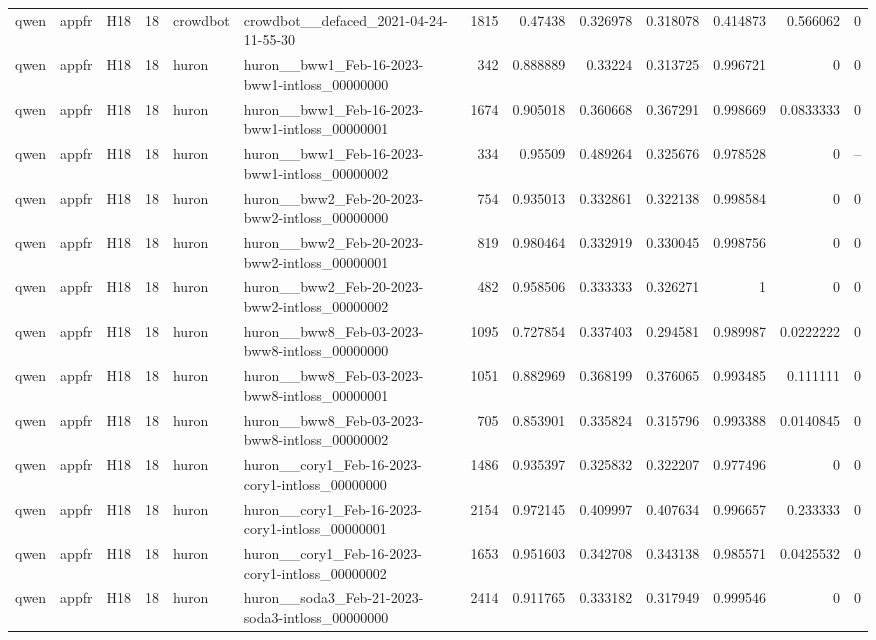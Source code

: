 \begin{longtable}{lllrllrrrrrrr}
qwen & appfr & H18 & 18 & crowdbot & crowdbot\_\_defaced\_2021-04-24-11-55-30 & 1815 & 0.47438 & 0.326978 & 0.318078 & 0.414873 & 0.566062 & 0 \\
qwen & appfr & H18 & 18 & huron & huron\_\_bww1\_Feb-16-2023-bww1-intloss\_00000000 & 342 & 0.888889 & 0.33224 & 0.313725 & 0.996721 & 0 & 0 \\
qwen & appfr & H18 & 18 & huron & huron\_\_bww1\_Feb-16-2023-bww1-intloss\_00000001 & 1674 & 0.905018 & 0.360668 & 0.367291 & 0.998669 & 0.0833333 & 0 \\
qwen & appfr & H18 & 18 & huron & huron\_\_bww1\_Feb-16-2023-bww1-intloss\_00000002 & 334 & 0.95509 & 0.489264 & 0.325676 & 0.978528 & 0 & -- \\
qwen & appfr & H18 & 18 & huron & huron\_\_bww2\_Feb-20-2023-bww2-intloss\_00000000 & 754 & 0.935013 & 0.332861 & 0.322138 & 0.998584 & 0 & 0 \\
qwen & appfr & H18 & 18 & huron & huron\_\_bww2\_Feb-20-2023-bww2-intloss\_00000001 & 819 & 0.980464 & 0.332919 & 0.330045 & 0.998756 & 0 & 0 \\
qwen & appfr & H18 & 18 & huron & huron\_\_bww2\_Feb-20-2023-bww2-intloss\_00000002 & 482 & 0.958506 & 0.333333 & 0.326271 & 1 & 0 & 0 \\
qwen & appfr & H18 & 18 & huron & huron\_\_bww8\_Feb-03-2023-bww8-intloss\_00000000 & 1095 & 0.727854 & 0.337403 & 0.294581 & 0.989987 & 0.0222222 & 0 \\
qwen & appfr & H18 & 18 & huron & huron\_\_bww8\_Feb-03-2023-bww8-intloss\_00000001 & 1051 & 0.882969 & 0.368199 & 0.376065 & 0.993485 & 0.111111 & 0 \\
qwen & appfr & H18 & 18 & huron & huron\_\_bww8\_Feb-03-2023-bww8-intloss\_00000002 & 705 & 0.853901 & 0.335824 & 0.315796 & 0.993388 & 0.0140845 & 0 \\
qwen & appfr & H18 & 18 & huron & huron\_\_cory1\_Feb-16-2023-cory1-intloss\_00000000 & 1486 & 0.935397 & 0.325832 & 0.322207 & 0.977496 & 0 & 0 \\
qwen & appfr & H18 & 18 & huron & huron\_\_cory1\_Feb-16-2023-cory1-intloss\_00000001 & 2154 & 0.972145 & 0.409997 & 0.407634 & 0.996657 & 0.233333 & 0 \\
qwen & appfr & H18 & 18 & huron & huron\_\_cory1\_Feb-16-2023-cory1-intloss\_00000002 & 1653 & 0.951603 & 0.342708 & 0.343138 & 0.985571 & 0.0425532 & 0 \\
qwen & appfr & H18 & 18 & huron & huron\_\_soda3\_Feb-21-2023-soda3-intloss\_00000000 & 2414 & 0.911765 & 0.333182 & 0.317949 & 0.999546 & 0 & 0 \\

\end{longtable}
